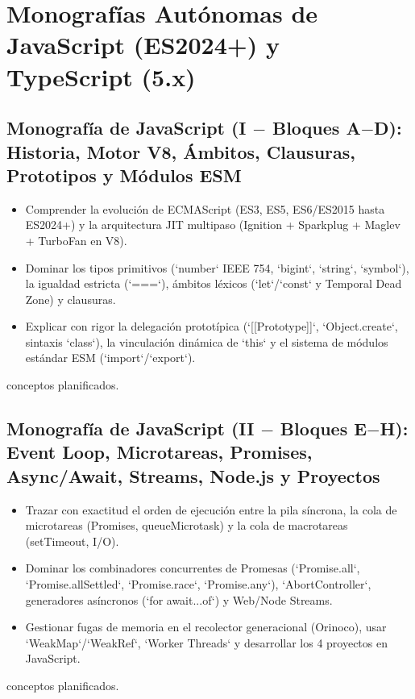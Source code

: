 \documentclass{book}
\begin{document}
\section*{Monografías Autónomas de JavaScript (ES2024+) y TypeScript (5.x)}

\subsection*{\checkmark Monografía de JavaScript (I \(-\) Bloques A\(-\)D): Historia, Motor V8, Ámbitos, Clausuras, Prototipos y Módulos ESM}
\begin{itemize}
\item Comprender la evolución de ECMAScript (ES3, ES5, ES6/ES2015 hasta ES2024+) y la arquitectura JIT multipaso (Ignition + Sparkplug + Maglev + TurboFan en V8).
\item Dominar los tipos primitivos (`number` IEEE 754, `bigint`, `string`, `symbol`), la igualdad estricta (`===`), ámbitos léxicos (`let`/`const` y Temporal Dead Zone) y clausuras.
\item Explicar con rigor la delegación prototípica (`[[Prototype]]`, `Object.create`, sintaxis `class`), la vinculación dinámica de `this` y el sistema de módulos estándar ESM (`import`/`export`).
\end{itemize}
 conceptos planificados.

\subsection*{\checkmark Monografía de JavaScript (II \(-\) Bloques E\(-\)H): Event Loop, Microtareas, Promises, Async/Await, Streams, Node.js y Proyectos}
\begin{itemize}
\item Trazar con exactitud el orden de ejecución entre la pila síncrona, la cola de microtareas (Promises, queueMicrotask) y la cola de macrotareas (setTimeout, I/O).
\item Dominar los combinadores concurrentes de Promesas (`Promise.all`, `Promise.allSettled`, `Promise.race`, `Promise.any`), `AbortController`, generadores asíncronos (`for await...of`) y Web/Node Streams.
\item Gestionar fugas de memoria en el recolector generacional (Orinoco), usar `WeakMap`/`WeakRef`, `Worker Threads` y desarrollar los 4 proyectos en JavaScript.
\end{itemize}
 conceptos planificados.
\end{document}
